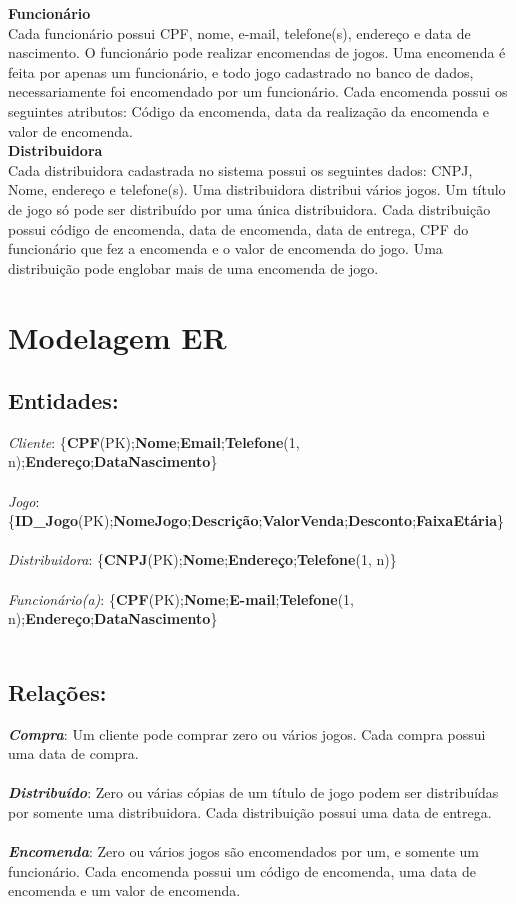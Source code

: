 \documentclass[11pt]{article}
\begin{document}
\textbf{Funcionário}\\
Cada funcionário possui CPF, nome, e-mail, telefone(s), endereço e data de nascimento. O funcionário pode realizar encomendas de jogos. Uma encomenda é feita por apenas um funcionário, e todo jogo cadastrado no banco de dados, necessariamente foi encomendado por um funcionário. Cada encomenda possui os seguintes atributos: Código da encomenda, data da realização da encomenda e valor de encomenda.\\

\textbf{Distribuidora}\\
Cada distribuidora cadastrada no sistema possui os seguintes dados: CNPJ, Nome, endereço e telefone(s). Uma distribuidora distribui vários jogos. Um título de jogo só pode ser distribuído por uma única distribuidora. Cada distribuição possui código de encomenda, data de encomenda, data de entrega, CPF do funcionário que fez a encomenda e o valor de encomenda do jogo. Uma distribuição pode englobar mais de uma encomenda de jogo.\\

\section{Modelagem ER}

\subsection{\textbf{Entidades}:}

\textit{Cliente}: \{\textbf{CPF}(PK);\textbf{Nome};\textbf{Email};\textbf{Telefone}(1, n);\textbf{Endereço};\textbf{DataNascimento}\}\\\\
\textit{Jogo}: \{\textbf{ID\_Jogo}(PK);\textbf{NomeJogo};\textbf{Descrição};\textbf{ValorVenda};\textbf{Desconto};\textbf{FaixaEtária}\}\\\\
\textit{Distribuidora}: \{\textbf{CNPJ}(PK);\textbf{Nome};\textbf{Endereço};\textbf{Telefone}(1, n)\}\\\\
\textit{Funcionário(a)}: \{\textbf{CPF}(PK);\textbf{Nome};\textbf{E-mail};\textbf{Telefone}(1, n);\textbf{Endereço};\textbf{DataNascimento}\}\\\\

\subsection{\textbf{Relações}:}
\textit{\textbf{Compra}}: Um cliente pode comprar zero ou vários jogos. Cada compra possui uma data de compra.\\\\
\textit{\textbf{Distribuído}}: Zero ou várias cópias de um título de jogo podem ser distribuídas por somente uma distribuidora. Cada distribuição possui uma data de entrega.\\\\
\textit{\textbf{Encomenda}}: Zero ou vários jogos são encomendados por um, e somente um funcionário. Cada encomenda possui um código de encomenda, uma data de encomenda e um valor de encomenda.
\end{document}
